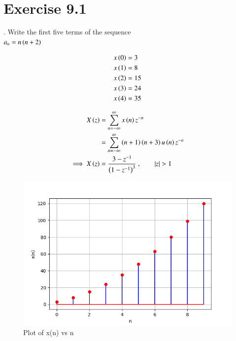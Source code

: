 \documentclass[journal,12pt,twocolumn]{IEEEtran}
\begin{document}


\vspace{3cm}

\title{}
\author{EE23BTECH11024 - G.Karthik Yadav$^{*}$
}
\maketitle
\newpage
\bigskip



\section*{Exercise 9.1}

. \hspace{2pt}Write the first five terms of the sequence\\
$a_n = n \left(n+2\right)$

\solution



\begin{align}
	x \left(0\right) & = 3 \\
x \left(1\right) & =  8\\
x \left(2\right) & =  15\\
x \left(3\right) & =  24\\
x \left(4\right) & =  35
\end{align} 

\begin{align}
    X \left(z\right) & = \sum_{n=-\infty}^{\infty} x \left(n\right)   z^{-n} \\
    & = \sum_{n=-\infty}^{\infty}  \left(n+1\right)\left(n+3\right) u \left(n\right)   z^{-n} \\
    \implies X \left(z\right) & = \frac{ 3-z^{-1}}{\left(1-z^{-1}\right)^3} \text{ ,}\qquad \left\vert z\right\vert>1
\end{align}

\begin{figure}[ht]
   \centering
   \includegraphics[width=1\columnwidth]{figs/plot1.png}
   \caption{Plot of x(n) vs n}
   \label{fig: 1.11.9.1.1}
\end{figure}
\end{document}
